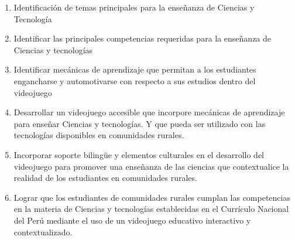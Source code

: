 
\begin{enumerate}[label=O\arabic*.,itemsep=5pt]
    \item Identificación de temas principales para la enseñanza de Ciencias y Tecnología
    \item Identificar las principales competencias requeridas para la enseñanza de Ciencias y tecnologías
    \item Identificar mecánicas de aprendizaje que permitan a los estudiantes engancharse y automotivarse con respecto a sus estudios dentro del videojuego
    \item Desarrollar un videojuego accesible que incorpore mecánicas de aprendizaje para enseñar Ciencias y tecnologías. Y que pueda ser utilizado con las tecnologías disponibles en comunidades rurales.
    \item Incorporar soporte bilingüe y elementos culturales en el desarrollo del videojuego para promover una enseñanza de las ciencias que contextualice la realidad de los estudiantes en comunidades rurales.
    \item Lograr que los estudiantes de comunidades rurales cumplan las competencias en la materia de Ciencias y tecnologías establecidas en el Currículo Nacional del Perú mediante el uso de un videojuego educativo interactivo y contextualizado.
\end{enumerate}

